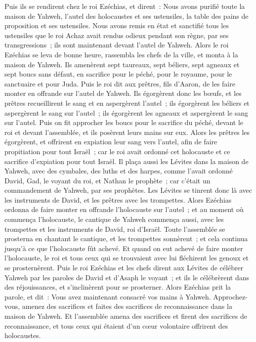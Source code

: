 \begin{multicols}{2}
Puis ils se rendirent chez le roi Ezéchias, et dirent~: Nous avons purifié toute la maison de Yahweh, l'autel des holocaustes et ses ustensiles, la table des pains de proposition et ses ustensiles.
Nous avons remis en état et sanctifié tous les ustensiles que le roi Achaz avait rendus odieux pendant son règne, par ses transgressions~; ils sont maintenant devant l'autel de Yahweh.
Alors le roi Ezéchias se leva de bonne heure, rassembla les chefs de la ville, et monta à la maison de Yahweh.
Ils amenèrent sept taureaux, sept béliers, sept agneaux et sept boucs sans défaut, en sacrifice pour le péché, pour le royaume, pour le sanctuaire et pour Juda. Puis le roi dit aux prêtres, fils d'Aaron, de les faire monter en offrande sur l'autel de Yahweh.
Ils égorgèrent donc les bœufs, et les prêtres recueillirent le sang et en aspergèrent l'autel~; ils égorgèrent les béliers et aspergèrent le sang sur l'autel~; ils égorgèrent les agneaux et aspergèrent le sang sur l'autel.
Puis on fit approcher les boucs pour le sacrifice du péché, devant le roi et devant l'assemblée, et ils posèrent leurs mains sur eux.
Alors les prêtres les égorgèrent, et offrirent en expiation leur sang vers l'autel, afin de faire propitiation pour tout Israël~; car le roi avait ordonné cet holocauste et ce sacrifice d'expiation pour tout Israël.
Il plaça aussi les Lévites dans la maison de Yahweh, avec des cymbales, des luths et des harpes, comme l'avait ordonné David, Gad, le voyant du roi, et Nathan le prophète~; car c'était un commandement de Yahweh, par ses prophètes.
Les Lévites se tinrent donc là avec les instruments de David, et les prêtres avec les trompettes.
Alors Ezéchias ordonna de faire monter en offrande l'holocauste sur l'autel~; et au moment où commença l'holocauste, le cantique de Yahweh commença aussi, avec les trompettes et les instruments de David, roi d'Israël.
Toute l'assemblée se prosterna en chantant le cantique, et les trompettes sonnèrent~; et cela continua jusqu'à ce que l'holocauste fût achevé.
Et quand on eut achevé de faire monter l'holocauste, le roi et tous ceux qui se trouvaient avec lui fléchirent les genoux et se prosternèrent.
Puis le roi Ezéchias et les chefs dirent aux Lévites de célébrer Yahweh par les paroles de David et d'Asaph le voyant~; et ils le célébrèrent dans des réjouissances, et s'inclinèrent pour se prosterner.
Alors Ezéchias prit la parole, et dit~: Vous avez maintenant consacré vos mains à Yahweh. Approchez-vous, amenez des sacrifices et faites des sacrifices de reconnaissance dans la maison de Yahweh. Et l'assemblée amena des sacrifices et firent des sacrifices de reconnaissance, et tous ceux qui étaient d'un cœur volontaire offrirent des holocaustes.

\end{multicols}
